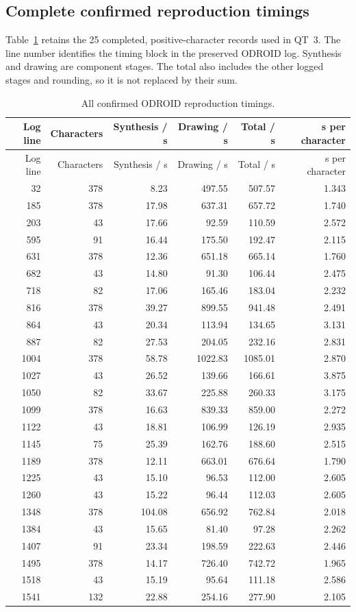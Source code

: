 \subsection{Complete confirmed reproduction timings}
Table~\ref{tab:app-complete-timings} retains the 25 completed, positive-character records used in QT~3. The line number identifies the timing block in the preserved ODROID log. Synthesis and drawing are component stages. The total also includes the other logged stages and rounding, so it is not replaced by their sum.
\begin{longtable}{rrrrrr}
\caption{All confirmed ODROID reproduction timings.}\label{tab:app-complete-timings}\\
\toprule Log line & Characters & Synthesis / s & Drawing / s & Total / s & s per character\\\midrule\endfirsthead
\toprule Log line & Characters & Synthesis / s & Drawing / s & Total / s & s per character\\\midrule\endhead
32 & 378 & 8.23 & 497.55 & 507.57 & 1.343\\
185 & 378 & 17.98 & 637.31 & 657.72 & 1.740\\
203 & 43 & 17.66 & 92.59 & 110.59 & 2.572\\
595 & 91 & 16.44 & 175.50 & 192.47 & 2.115\\
631 & 378 & 12.36 & 651.18 & 665.14 & 1.760\\
682 & 43 & 14.80 & 91.30 & 106.44 & 2.475\\
718 & 82 & 17.06 & 165.46 & 183.04 & 2.232\\
816 & 378 & 39.27 & 899.55 & 941.48 & 2.491\\
864 & 43 & 20.34 & 113.94 & 134.65 & 3.131\\
887 & 82 & 27.53 & 204.05 & 232.16 & 2.831\\
1004 & 378 & 58.78 & 1022.83 & 1085.01 & 2.870\\
1027 & 43 & 26.52 & 139.66 & 166.61 & 3.875\\
1050 & 82 & 33.67 & 225.88 & 260.33 & 3.175\\
1099 & 378 & 16.63 & 839.33 & 859.00 & 2.272\\
1122 & 43 & 18.81 & 106.99 & 126.19 & 2.935\\
1145 & 75 & 25.39 & 162.76 & 188.60 & 2.515\\
1189 & 378 & 12.11 & 663.01 & 676.64 & 1.790\\
1225 & 43 & 15.10 & 96.53 & 112.00 & 2.605\\
1260 & 43 & 15.22 & 96.44 & 112.03 & 2.605\\
1348 & 378 & 104.08 & 656.92 & 762.84 & 2.018\\
1384 & 43 & 15.65 & 81.40 & 97.28 & 2.262\\
1407 & 91 & 23.34 & 198.59 & 222.63 & 2.446\\
1495 & 378 & 14.17 & 726.40 & 742.72 & 1.965\\
1518 & 43 & 15.19 & 95.64 & 111.18 & 2.586\\
1541 & 132 & 22.88 & 254.16 & 277.90 & 2.105\\
\bottomrule\end{longtable}



